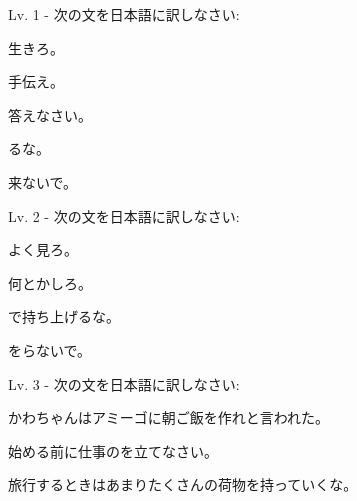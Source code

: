 
\author{Kristijan Čavić}

	
	\begin{mondai}{Lv. 1 - 次の文を日本語に訳しなさい: }
		\item 生きろ。
		\item 手伝え。
		\item 答えなさい。
		\item {}るな。
		\item 来ないで。
	\end{mondai}
	
	\begin{mondai}{Lv. 2 - 次の文を日本語に訳しなさい:}
		\item よく見ろ。
		\item 何とかしろ。
		\item {}で持ち上げるな。
		\item {}をらないで。
	\end{mondai}
	
	\begin{mondai}{Lv. 3 - 次の文を日本語に訳しなさい:}
		\item かわちゃんはアミーゴに朝ご飯を作れと言われた。
		\item 始める前に仕事のを立てなさい。
		\item 旅行するときはあまりたくさんの荷物を持っていくな。
	\end{mondai}
